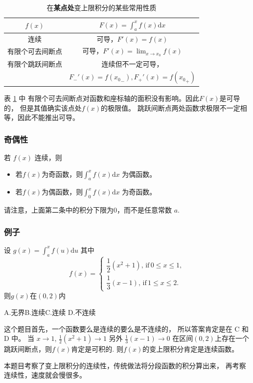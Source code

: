 \begin{table}
    \centering
    \begin{tabular}{cc}
        \toprule
        $f(x)$ & $F(x) = \int_a^x f(x) \mathrm{d}x$ \\
        \midrule
        连续             & 可导，$F'(x) = f(x)$ \\
        有限个可去间断点 & 可导，$F'(x) = \lim_{x \to x_0} f(x)$\\
        有限个跳跃间断点 & 连续但不一定可导，\\
        {}&$F_{-}'(x) = f({x_0}_{-}), F_{+}'(x) = f({x_0}_{+})$ \\
        \bottomrule
    \end{tabular}
    \caption{在\textbf{某点处}变上限积分的某些常用性质}
    \label{tab:useful-properoties-of-variable-limits-integral}
\end{table}

表 \ref{tab:useful-properoties-of-variable-limits-integral} 中
有限个可去间断点对函数和座标轴的面积没有影响。因此$F(x)$是可导的，
但是其值确实该点处$f(x)$的极限值。
跳跃间断点两处函数求极限不一定相等，因此不能推出可导。

\subsubsection{奇偶性}

若 $f(x)$ 连续，则
\begin{itemize}
    \item 若$f(x)$为奇函数，则$\int_a^x f(x) \mathrm{d}x$ 为偶函数。
    \item 若$f(x)$为偶函数，则$\int_0^x f(x) \mathrm{d}x$ 为奇函数。
\end{itemize}
请注意，上面第二条中的积分下限为$0$，而不是任意常数 $a$.

\subsubsection{例子}

\begin{example}
    设 $g(x) = \int_a^x f(u) \mathrm{d} u$ 其中
    \[
        f(x) = \left\{
            \begin{array}{rl}
                \dfrac{1}{2} (x^2+1),\, \mbox{if}\, 0 \leq x \leq 1, \\[1em]
                \dfrac{1}{3} (x-1),  \, \mbox{if}\, 1 \leq x \leq 2.
            \end{array}
        \right.
    \]
    则$g(x)$在$(0, 2)$内

    A.无界\quad B.连续\quad C.连续 \quad D.不连续

    这个题目首先，一个函数要么是连续的要么是不连续的，
    所以答案肯定是在 C 和 D 中。
    当 $x \to 1$, $\frac{1}{2} (x^2 + 1) \to 1$ 
    另外 $\frac{1}{3} (x - 1) \to 0$
    在区间$(0,2)$上存在一个跳跃间断点，则$f(x)$肯定是可积的.
    则$f(x)$的变上限积分肯定是连续函数。

    本题目考察了变上限积分的连续性，传统做法将分段函数的积分算出来，
    再考察连续性，速度就会慢很多。
\end{example}

